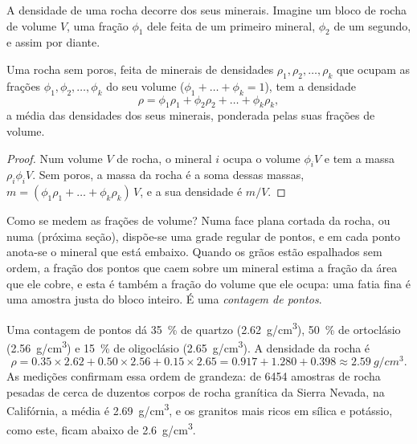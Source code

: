 A densidade de uma rocha decorre dos seus minerais. Imagine um bloco de
rocha de volume $V$, uma fração $\phi_1$ dele feita de um primeiro mineral,
$\phi_2$ de um segundo, e assim por diante.

\begin{proposition}\label{prop:g11:minerals:density}
Uma rocha sem poros, feita de minerais de densidades $\rho_1, \rho_2, \dots,
\rho_k$ que ocupam as frações $\phi_1, \phi_2, \dots, \phi_k$ do seu volume
($\phi_1 + \dots + \phi_k = 1$), tem a densidade
\[
  \rho = \phi_1 \rho_1 + \phi_2 \rho_2 + \dots + \phi_k \rho_k ,
\]
a média das densidades dos seus minerais, ponderada pelas suas frações de
volume.
\end{proposition}

\begin{proof}
Num volume $V$ de rocha, o mineral $i$ ocupa o volume $\phi_i V$ e tem a
massa $\rho_i \phi_i V$. Sem poros, a massa da rocha é a soma dessas
massas, $m = (\phi_1 \rho_1 + \dots + \phi_k \rho_k)\,V$, e a sua
densidade é $m/V$.
\end{proof}

Como se medem as frações de volume? Numa face plana cortada da rocha, ou
numa  (próxima seção), dispõe-se uma grade regular de pontos,
e em cada ponto anota-se o mineral que está embaixo. Quando os grãos estão
espalhados sem ordem, a fração dos pontos que caem sobre um mineral estima a
fração da área que ele cobre, e esta é também a fração do volume que ele
ocupa: uma fatia fina é uma amostra justa do bloco inteiro. É uma
\emph{contagem de pontos}.

\begin{example}
Uma contagem de pontos dá \qty{35}{\percent} de quartzo (\qty{2.62}{g/cm^3}),
\qty{50}{\percent} de ortoclásio (\qty{2.56}{g/cm^3}) e \qty{15}{\percent}
de oligoclásio (\qty{2.65}{g/cm^3}). A densidade da rocha é
\[
  \rho = 0.35 \times 2.62 + 0.50 \times 2.56 + 0.15 \times 2.65
       = 0.917 + 1.280 + 0.398 \approx \qty{2.59}{g/cm^3}.
\]
As medições confirmam essa ordem de grandeza: de \num{6454} amostras de
rocha pesadas de cerca de duzentos corpos de rocha granítica da Sierra
Nevada, na Califórnia, a média é \qty{2.69}{g/cm^3}, e os granitos mais
ricos em sílica e potássio, como este, ficam abaixo de \qty{2.6}{g/cm^3}.
\end{example}

